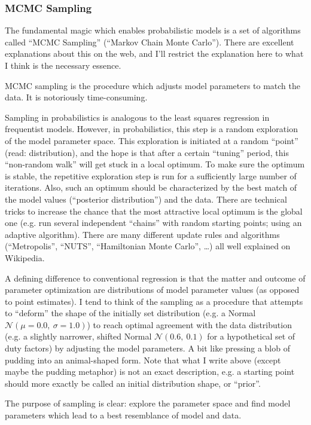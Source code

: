\subsubsection{MCMC Sampling}
\label{workflow:sampling}
The fundamental magic which enables probabilistic models is a set of algorithms called ``MCMC Sampling'' (``Markov Chain Monte Carlo'').
There are excellent explanations about this on the web, and I'll restrict the explanation here to what I think is the necessary essence.

MCMC sampling is the procedure which adjusts model parameters to match the data.
It is notoriously time-consuming.

Sampling in probabilistics is analogous to the least squares regression in frequentist models.
However, in probabilistics, this step is a random exploration of the model parameter space.
This exploration is initiated at a random ``point'' (read: distribution), and the hope is that after a certain ``tuning'' period, this ``non-random walk'' will get stuck in a local optimum.
To make sure the optimum is stable, the repetitive exploration step is run for a sufficiently large number of iterations.
Also, such an optimum should be characterized by the best match of the model values (``posterior distribution'') and the data.
There are technical tricks to increase the chance that the most attractive local optimum is the global one (e.g. run several independent ``chains'' with random starting points; using an adaptive algorithm).
There are many different update rules and algorithms (``Metropolis'', ``NUTS'', ``Hamiltonian Monte Carlo'', \ldots{}) all well explained on Wikipedia.

A defining difference to conventional regression is that the matter and outcome of parameter optimization are distributions of model parameter values (as opposed to point estimates).
I tend to think of the sampling as a procedure that attempts to ``deform'' the shape of the initially set distribution (e.g. a Normal \(\mathcal{{N}}\left(\mu = 0.0,\ \sigma = 1.0\right)\)) to reach optimal agreement with the data distribution (e.g. a slightly narrower, shifted Normal \(\mathcal{{N}}\left(0.6,\ 0.1\right)\) for a hypothetical set of duty factors) by adjusting the model parameters.
A bit like pressing a blob of pudding into an animal-shaped form.
Note that what I write above (except maybe the pudding metaphor) is not an exact description, e.g. a starting point should more exactly be called an initial distribution shape, or ``prior''.

The purpose of sampling is clear: explore the parameter space and find model parameters which lead to a best resemblance of model and data.


